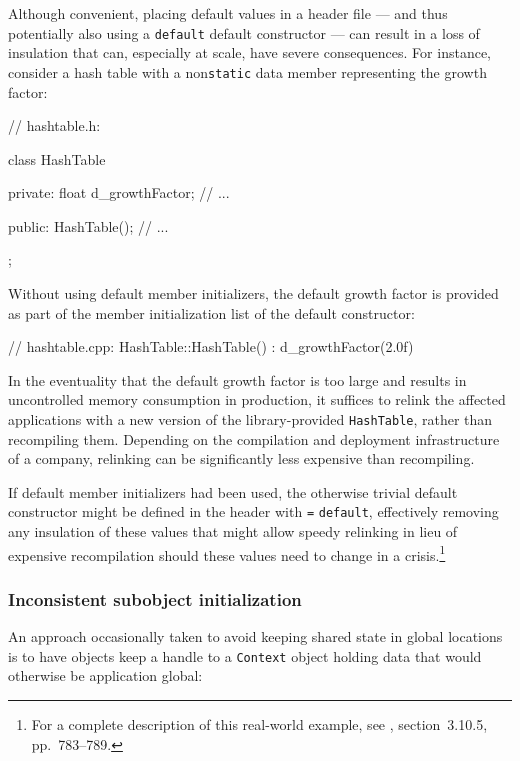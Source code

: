 Although convenient, placing default values in a header file --- and
thus potentially also using a \lstinline!default! default constructor ---
can result in a loss of insulation that can, especially at scale, have
severe consequences. For instance, consider a hash table with a
non\lstinline!static! data member representing the growth factor:

\begin{emcppslisting}
// hashtable.h:

class HashTable
{
private:
    float d_growthFactor;
    // ...

public:
    HashTable();
    // ...
};
\end{emcppslisting}
    

Without using default member initializers, the default growth factor is
provided as part of the member initialization list of the default
constructor:

\begin{emcppslisting}
// hashtable.cpp:
HashTable::HashTable() : d_growthFactor(2.0f) { }
\end{emcppslisting}
    

In the eventuality that the default growth factor is too large and
results in uncontrolled memory consumption in production, it suffices to
relink the affected applications with a new version of the
library-provided \lstinline!HashTable!, rather than recompiling them.
Depending on the compilation and deployment infrastructure of a company,
relinking can be significantly less expensive than recompiling.

If default member initializers had been used, the otherwise trivial
default constructor might be defined in the header with \lstinline!=!
\lstinline!default!, effectively removing any insulation of these values
that might allow speedy relinking in lieu of expensive recompilation
should these values need to change in a crisis.{\cprotect\footnote{For a
complete description of this real-world example, see \cite{lakos20},
  section~3.10.5, pp.~783--789.}}

\subsubsection[Inconsistent subobject initialization]{Inconsistent subobject initialization}\label{inconsistent-subobject-initialization}

An approach occasionally taken to avoid keeping shared state in global
locations is to have objects keep a handle to a \lstinline!Context! object
holding data that would otherwise be application global:

